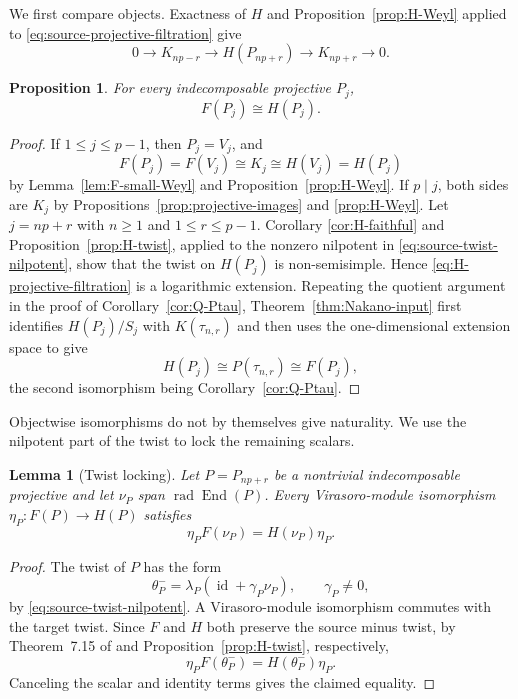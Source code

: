 \documentclass[12pt,leqno]{amsart}
\numberwithin{equation}{section}
\newtheorem{lem}[thm]{Lemma}
\newtheorem{prop}[thm]{Proposition}
\newcommand{\End}{\operatorname{End}}
\newcommand{\rad}{\operatorname{rad}}
\newcommand{\id}{\operatorname{id}}
\begin{document}
We first compare objects.  Exactness of $H$ and
Proposition~\ref{prop:H-Weyl} applied to
\eqref{eq:source-projective-filtration} give
\begin{equation}\label{eq:H-projective-filtration}
 0\longrightarrow K_{np-r}\longrightarrow H(P_{np+r})
 \longrightarrow K_{np+r}\longrightarrow0.
\end{equation}

\begin{prop}\label{prop:projective-object-comparison}
For every indecomposable projective $P_j$,
\[
 F(P_j)\cong H(P_j).
\]
\end{prop}

\begin{proof}
If $1\leq j\leq p-1$, then $P_j=V_j$, and
\[
 F(P_j)=F(V_j)\cong K_j\cong H(V_j)=H(P_j)
\]
by Lemma~\ref{lem:F-small-Weyl} and Proposition~\ref{prop:H-Weyl}.
If $p\mid j$, both sides are $K_j$ by
Propositions~\ref{prop:projective-images} and \ref{prop:H-Weyl}.
Let $j=np+r$ with $n\geq1$ and $1\leq r\leq p-1$.  Corollary
\ref{cor:H-faithful} and Proposition~\ref{prop:H-twist}, applied to the
nonzero nilpotent in \eqref{eq:source-twist-nilpotent}, show that the twist
on $H(P_j)$ is non-semisimple.  Hence \eqref{eq:H-projective-filtration} is
a logarithmic extension.  Repeating the quotient argument in the proof of
Corollary~\ref{cor:Q-Ptau}, Theorem~\ref{thm:Nakano-input} first identifies
$H(P_j)/S_j$ with $K(\tau_{n,r})$ and then uses the one-dimensional
extension space to give
\[
 H(P_j)\cong P(\tau_{n,r})\cong F(P_j),
\]
the second isomorphism being Corollary~\ref{cor:Q-Ptau}.
\end{proof}

Objectwise isomorphisms do not by themselves give naturality.  We use the
nilpotent part of the twist to lock the remaining scalars.

\begin{lem}[Twist locking]\label{lem:twist-locking}
Let $P=P_{np+r}$ be a nontrivial indecomposable projective and let
$\nu_P$ span $\rad\End(P)$.  Every Virasoro-module isomorphism
$\eta_P:F(P)\to H(P)$ satisfies
\[
 \eta_PF(\nu_P)=H(\nu_P)\eta_P.
\]
\end{lem}

\begin{proof}
The twist of $P$ has the form
\[
 \theta^-_P=\lambda_P(\id+\gamma_P\nu_P),
 \qquad \gamma_P\neq0,
\]
by \eqref{eq:source-twist-nilpotent}.  A Virasoro-module isomorphism
commutes with the target twist.  Since $F$ and $H$ both preserve the source
minus twist, by Theorem~7.15 of \cite{McRaeYang} and
Proposition~\ref{prop:H-twist}, respectively,
\[
 \eta_PF(\theta^-_P)=H(\theta^-_P)\eta_P.
\]
Canceling the scalar and identity terms gives the claimed equality.
\end{proof}
\end{document}
